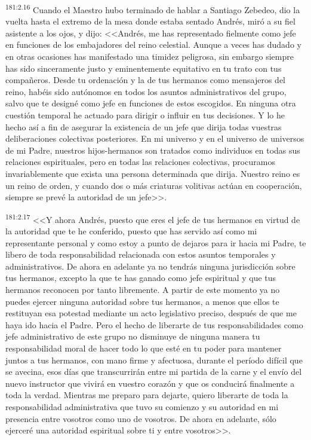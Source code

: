 \par 
\textsuperscript{181:2.16} Cuando el Maestro hubo terminado de hablar a Santiago Zebedeo, dio la vuelta hasta el extremo de la mesa donde estaba sentado Andrés, miró a su fiel asistente a los ojos, y dijo: <<Andrés, me has representado fielmente como jefe en funciones de los embajadores del reino celestial. Aunque a veces has dudado y en otras ocasiones has manifestado una timidez peligrosa, sin embargo siempre has sido sinceramente justo y eminentemente equitativo en tu trato con tus compañeros. Desde tu ordenación y la de tus hermanos como mensajeros del reino, habéis sido autónomos en todos los asuntos administrativos del grupo, salvo que te designé como jefe en funciones de estos escogidos. En ninguna otra cuestión temporal he actuado para dirigir o influir en tus decisiones. Y lo he hecho así a fin de asegurar la existencia de un jefe que dirija todas vuestras deliberaciones colectivas posteriores. En mi universo y en el universo de universos de mi Padre, nuestros hijos-hermanos son tratados como individuos en todas sus relaciones espirituales, pero en todas las relaciones colectivas, procuramos invariablemente que exista una persona determinada que dirija. Nuestro reino es un reino de orden, y cuando dos o más criaturas volitivas actúan en cooperación, siempre se prevé la autoridad de un jefe>>.

\par 
\textsuperscript{181:2.17} <<Y ahora Andrés, puesto que eres el jefe de tus hermanos en virtud de la autoridad que te he conferido, puesto que has servido así como mi representante personal y como estoy a punto de dejaros para ir hacia mi Padre, te libero de toda responsabilidad relacionada con estos asuntos temporales y administrativos. De ahora en adelante ya no tendrás ninguna jurisdicción sobre tus hermanos, excepto la que te has ganado como jefe espiritual y que tus hermanos reconocen por tanto libremente. A partir de este momento ya no puedes ejercer ninguna autoridad sobre tus hermanos, a menos que ellos te restituyan esa potestad mediante un acto legislativo preciso, después de que me haya ido hacia el Padre. Pero el hecho de liberarte de tus responsabilidades como jefe administrativo de este grupo no disminuye de ninguna manera tu responsabilidad moral de hacer todo lo que esté en tu poder para mantener juntos a tus hermanos, con mano firme y afectuosa, durante el período difícil que se avecina, esos días que transcurrirán entre mi partida de la carne y el envío del nuevo instructor que vivirá en vuestro corazón y que os conducirá finalmente a toda la verdad. Mientras me preparo para dejarte, quiero liberarte de toda la responsabilidad administrativa que tuvo su comienzo y su autoridad en mi presencia entre vosotros como uno de vosotros. De ahora en adelante, sólo ejerceré una autoridad espiritual sobre ti y entre vosotros>>.


